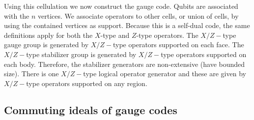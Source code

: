 \documentclass[a4paper,onecolumn,11pt,unpublished]{quantumarticle}
\begin{document}
Using this cellulation we now construct the gauge code.
Qubits are associated with the $n$ vertices.
We associate operators to other cells, or union of cells,
by using the contained vertices as support.
Because this is a self-dual code, the same definitions apply for
both the $X$-type and $Z$-type operators.
The $X/Z-$type gauge group is generated by
$X/Z-$type operators supported on each face.
The $X/Z-$type stabilizer group is generated by
$X/Z-$type operators supported on each body.
Therefore, the stabilizer generators are non-extensive
(have bounded size).
There is one $X/Z-$type logical operator generator and these
are given by $X/Z-$type operators supported on any region.

\subsection{Commuting ideals of gauge codes}\label{Sec45}
\end{document}
